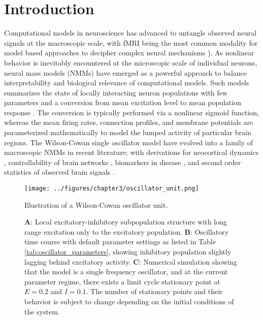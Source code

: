 \section{Introduction}
Computational models in neuroscience has advanced to untangle observed neural signals at the macroscopic scale, with fMRI being the most common modality for model based approaches to decipher complex neural mechanisms \cite{wilson_is_2015}). As nonlinear behavior is inevitably encountered at the microscopic scale of individual neurons, neural mass models (NMMs) have emerged as a powerful approach to balance interpretability and biological relevance of computational models. Such models summarizes the state of locally interacting neuron populations with few parameters and a conversion from mean excitation level to mean population response \cite{freeman_tutorial_1992}. The conversion is typically performed via a nonlinear sigmoid function, whereas the mean firing rates, connection profiles, and membrane potentials are parameterized mathematically to model the lumped activity of particular brain regions\cite{LopesdaSilva1974, robinson_prediction_2001, Valdes1999}. The Wilson-Cowan single oscillator model \cite{Wilson1972} have evolved into a family of macroscopic NMMs in recent literature; with derivations for neocortical dynamics \cite{cowan_wilsoncowan_2016}, controllability of brain networks \cite{muldoon_stimulation-based_2016}, biomarkers in disease \cite{Zimmermann2018}, and second order statistics of observed brain signals \cite{Deco2009, abeysuriya_biophysical_2018, singh_estimation_2020, byrne_next-generation_2019, wang_inversion_2019}.

\begin{figure}[ht]
    \centering
    \texttt{[image: ../figures/chapter3/oscillator\_unit.png]}
    \caption{Illustration of a Wilson-Cowan oscillator unit.}
    \caption*{\textbf{A}: Local excitatory-inhibitory subpopulation structure with long range excitation only to the excitatory population. \textbf{B}: Oscillatory time course with default parameter settings as listed in Table \ref{tab:oscillator_parameters}, showing inhibitory population slightly lagging behind excitatory activity. \textbf{C}: Numerical simulation showing that the model is a single frequency oscillator, and at the current parameter regime, there exists a limit cycle stationary point at $E = 0.2$ and $ I = 0.1$. The number of stationary points and their behavior is subject to change depending on the initial conditions of the system.}
    \label{fig:unit}
\end{figure}

